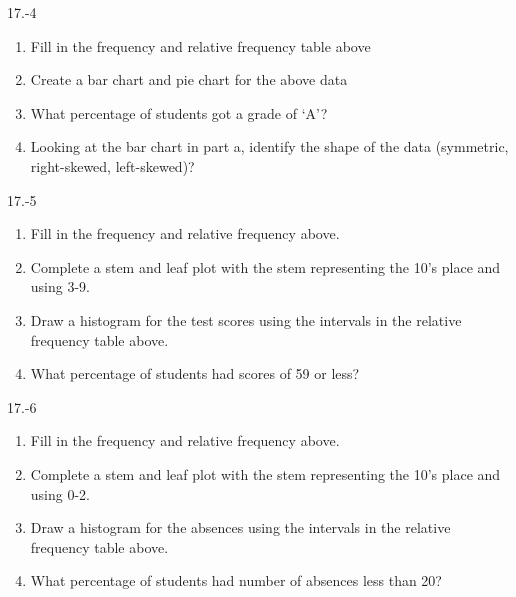 \begin{exsol@solution}{17.-4}
  \begin{enumerate}
  \item Fill in the frequency and relative frequency table above
  \item  Create a bar chart and pie chart for the above data
  \item  What percentage of students got a grade of `A'?
  \item  Looking at the bar chart in part a, identify the shape of the data (symmetric, right-skewed, left-skewed)?
\end{enumerate}

\end{exsol@solution}
\begin{exsol@solution}{17.-5}
  \begin{enumerate}
  \item Fill in the frequency and relative frequency above.
  \item	Complete a stem and leaf plot with the stem representing the 10’s place and using 3-9.
  \item Draw a histogram for the test scores using the intervals in the relative frequency table above.
  \item	What percentage of students had scores of 59 or less?
\end{enumerate}

\end{exsol@solution}
\begin{exsol@solution}{17.-6}
\begin{enumerate}
  \item	Fill in the frequency and relative frequency above.
  \item	Complete a stem and leaf plot with the stem representing the 10's place and using 0-2.
  \item	Draw a histogram for the absences using the intervals in the relative frequency table above.
  \item	What percentage of students had number of absences less than 20?
\end{enumerate}

\end{exsol@solution}
